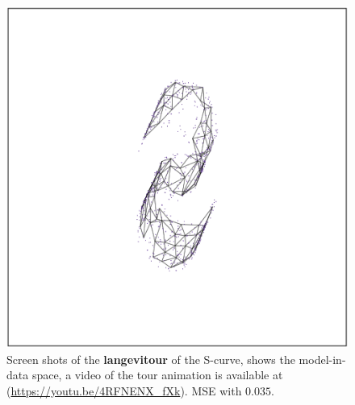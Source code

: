 \documentclass[
  12pt]{article}
\begin{document}
\begin{figure}[H]
%
\begin{minipage}{0.33\linewidth}
\includegraphics{figures/scurve/sc_best_3.png}\end{minipage}%

\caption{\label{fig-scurve_sc_best}Screen shots of the
\textbf{langevitour} of the S-curve, shows the model-in-data space, a
video of the tour animation is available at
(\url{https://youtu.be/4RFNENX_fXk}). MSE with \(0.035\).}

\end{figure}%
\end{document}
